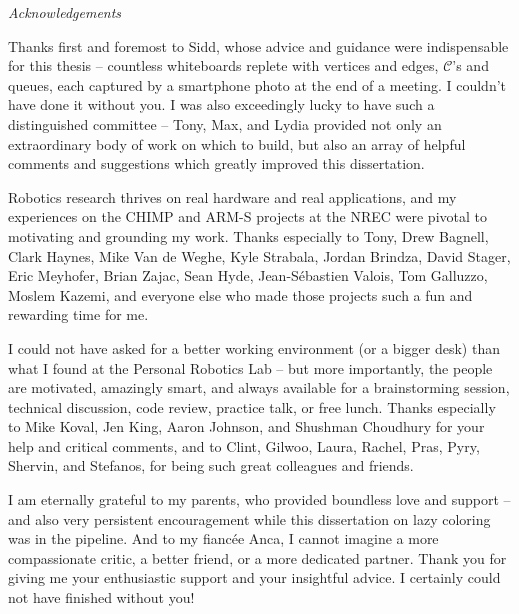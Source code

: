 
\begin{fullwidth}
\begin{adjustwidth}{1in}{1in}

{\LARGE \emph{Acknowledgements}}

\vspace{0.2in}

Thanks first and foremost to Sidd,
whose advice and guidance were indispensable for
this thesis
-- countless whiteboards replete with
vertices and edges, $\mathcal{C}$'s and queues,
each captured by a smartphone photo at the end of a meeting.
I couldn't have done it without you.
I was also exceedingly lucky to have such a distinguished
committee --
Tony, Max, and Lydia provided not only an extraordinary body of work
on which to build,
but also an array of helpful comments and suggestions which greatly
improved this dissertation.

\vspace{0.2cm}

Robotics research thrives on real hardware and real applications,
and my experiences on the CHIMP and ARM-S projects
at the NREC were pivotal to motivating and grounding my work.
Thanks especially to Tony, Drew Bagnell,
Clark Haynes, Mike Van de Weghe, Kyle Strabala, Jordan Brindza,
David Stager, Eric Meyhofer, Brian Zajac, Sean Hyde,
Jean-S\'{e}bastien Valois, Tom Galluzzo, Moslem Kazemi,
and everyone else who made those projects such a fun and rewarding
time for me.

\vspace{0.2cm}

I could not have asked for a better working environment
(or a bigger desk)
than what I found at the Personal Robotics Lab
-- but more importantly,
the people are motivated, amazingly smart, and always available
for a brainstorming session, technical discussion, code review,
practice talk, or free lunch.
Thanks especially to Mike Koval, Jen King, Aaron Johnson,
and Shushman Choudhury for your help and critical comments,
and to Clint, Gilwoo, Laura, Rachel, Pras, Pyry, Shervin, and Stefanos,
for being such great colleagues and friends.

\vspace{0.2cm}

I am eternally grateful to my parents,
who provided boundless love and support
-- and also very persistent encouragement
while this dissertation on lazy coloring was in the pipeline.
And to my fianc\'{e}e Anca,
I cannot imagine
a more compassionate critic,
a better friend,
or a more dedicated partner.
Thank you for giving me your enthusiastic support
and your insightful advice.
I certainly could not have finished without you!

\end{adjustwidth}
\end{fullwidth}
